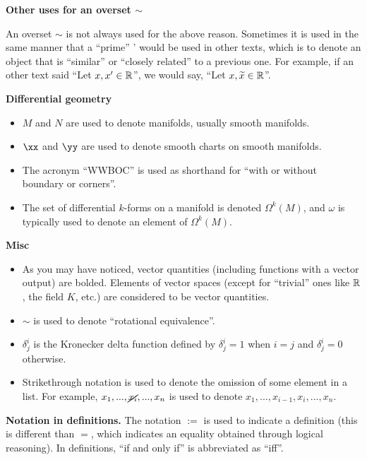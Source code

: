 \vspace{.25cm}

\textbf{Other uses for an overset $\sim$}

An overset $\sim$ is not always used for the above reason. Sometimes it is used in the same manner that a ``prime'' ' would be used in other texts, which is to denote an object that is ``similar'' or ``closely related'' to a previous one. For example, if an other text said ``Let $x, x' \in \mathbb{R}$'', we would say, ``Let $x, \widetilde{x} \in \mathbb{R}$''. 

\vspace{.25cm}

\textbf{Differential geometry}

\begin{itemize}
    \item $M$ and $N$ are used to denote manifolds, usually smooth manifolds.
    \item $\xx$ and $\yy$ are used to denote smooth charts on smooth manifolds.
    \item The acronym ``WWBOC'' is used as shorthand for ``with or without boundary or corners''.
    \item The set of differential $k$-forms on a manifold is denoted $\Omega^k(M)$, and $\omega$ is typically used to denote an element of $\Omega^k(M)$.
\end{itemize}

\textbf{Misc}

\begin{itemize}
    \item As you may have noticed, vector quantities (including functions with a vector output) are bolded. Elements of vector spaces (except for ``trivial'' ones like $\mathbb{R}$, the field $K$, etc.) are considered to be vector quantities.
    \item $\sim$ is used to denote ``rotational equivalence''.
    \item $\delta^i_j$ is the Kronecker delta function defined by $\delta^i_j = 1$ when $i = j$ and $\delta^i_j = 0$ otherwise.
    \item Strikethrough notation is used to denote the omission of some element in a list. For example, $x_1, ..., \cancel{x_i}, ..., x_n$ is used to denote $x_1, ..., x_{i - 1}, x_i, ..., x_n$.
\end{itemize}

\vspace{.25cm}

\textbf{Notation in definitions.} The notation $:=$ is used to indicate a definition (this is different than $=$, which indicates an equality obtained through logical reasoning). In definitions, ``if and only if'' is abbreviated as ``iff''.

